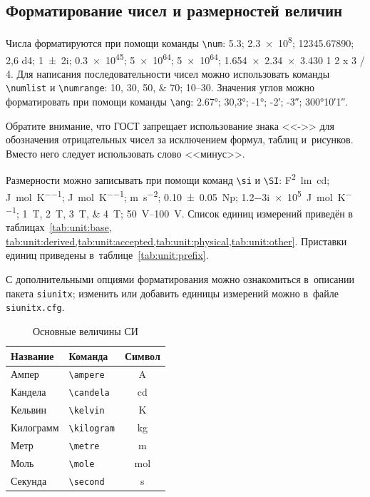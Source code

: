\subsection{Форматирование чисел и размерностей величин}\label{sec:units}

Числа форматируются при помощи команды \verb|\num|:
\num{5,3};
\num{2,3e8};
\num{12345,67890};
\num{2,6 d4};
\num{1+-2i};
\num{.3e45};
\num[exponent-base=2]{5 e64};
\num[exponent-base=2,exponent-to-prefix]{5 e64};
\num{1.654 x 2.34 x 3.430}
\num{1 2 x 3 / 4}.
Для написания последовательности чисел можно использовать команды \verb|\numlist| и \verb|\numrange|:
\numlist{10;30;50;70}; \numrange{10}{30}.
Значения углов можно форматировать при помощи команды \verb|\ang|:
\ang{2.67};
\ang{30,3};
\ang{-1;;};
\ang{;-2;};
\ang{;;-3};
\ang{300;10;1}.

Обратите внимание, что ГОСТ запрещает использование знака <<->> для обозначения отрицательных чисел
за исключением формул, таблиц и~рисунков.
Вместо него следует использовать слово <<минус>>.

Размерности можно записывать при помощи команд \verb|\si| и \verb|\SI|:
\si{\farad\squared\lumen\candela};
\si{\joule\per\mole\per\kelvin};
\si[per-mode = symbol-or-fraction]{\joule\per\mole\per\kelvin};
\si{\metre\per\second\squared};
\SI{0.10(5)}{\neper};
\SI{1.2-3i e5}{\joule\per\mole\per\kelvin};
\SIlist{1;2;3;4}{\tesla};
\SIrange{50}{100}{\volt}.
Список единиц измерений приведён в таблицах~\cref{tab:unit:base,
    tab:unit:derived,tab:unit:accepted,tab:unit:physical,tab:unit:other}.
Приставки единиц приведены в~таблице~\cref{tab:unit:prefix}.

С дополнительными опциями форматирования можно ознакомиться в~описании пакета \texttt{siunitx};
изменить или добавить единицы измерений можно в~файле \texttt{siunitx.cfg}.

\begin{table}
    \centering
    \captionsetup{justification=centering} %
    \caption{Основные величины СИ}\label{tab:unit:base}
    \begin{tabular}{llc}
        \toprule
        Название  & Команда                 & Символ         \\
        \midrule
        Ампер     & \verb|\ampere| & \si{\ampere}   \\
        Кандела   & \verb|\candela| & \si{\candela}  \\
        Кельвин   & \verb|\kelvin| & \si{\kelvin}   \\
        Килограмм & \verb|\kilogram| & \si{\kilogram} \\
        Метр      & \verb|\metre| & \si{\metre}    \\
        Моль      & \verb|\mole| & \si{\mole}     \\
        Секунда   & \verb|\second| & \si{\second}   \\
        \bottomrule
    \end{tabular}
\end{table}


